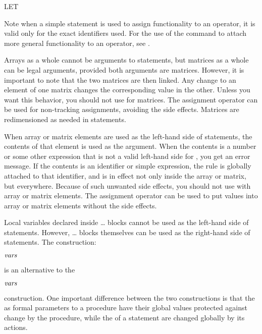 \begin{Command}[let]{LET}
\begin{Comments}
Note when a simple  statement is used to assign functionality to an
operator, it is valid only for the exact identifiers used.  For the use of the 
 command to attach more general functionality to an operator,
see .

Arrays as a whole cannot be arguments to  statements, but
matrices as a whole can be legal arguments, provided both arguments are
matrices.  However, it is important to note that the two matrices are then
linked.  Any change to an element of one matrix changes the corresponding
value in the other.  Unless you want this behavior, you should not use
 for matrices.  The assignment operator  can be used
for non-tracking assignments, avoiding the side effects.  Matrices are
redimensioned as needed in  statements.

When array or matrix elements are used as the left-hand side of 
statements, the contents of that element is used as the argument.  When the 
contents is a number or some other expression that is not a valid left-hand 
side for , you get an error message.  If the contents is an
identifier or simple expression, the  rule is globally attached 
to that identifier, and is in effect not only inside the array or matrix, 
but everywhere.  Because of such unwanted side effects, you should not 
use  with array or matrix elements.  The assignment operator 
\name{:=} can be used to put values into array or matrix elements without 
the side effects.

Local variables declared inside \ldots{} blocks cannot
be used as the left-hand side of  statements.  However,
\ldots{} blocks themselves can be used as the
right-hand side of  statements.  The construction:
\begin{Syntax}
         
        \(\meta{vars}\)\name{=}
\end{Syntax}
is an alternative to the 
\begin{Syntax}
         \(\meta{vars}\)\name{;}
\end{Syntax}
construction.  One important difference between the two constructions is that
the  as formal parameters to a procedure have their global values
protected against change by the procedure, while the  of a 
 statement are changed globally by its actions. 


\end{Comments}
\end{Command}
